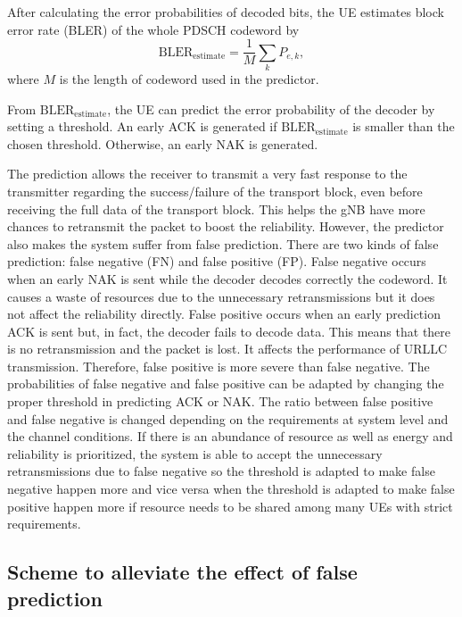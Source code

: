 \documentclass[conference]{IEEEtran}
\begin{document}
After calculating the error probabilities of decoded bits, the UE estimates block error rate (BLER) of the whole PDSCH codeword by
\begin{equation}
   \mathrm{BLER}_{\mathrm{estimate}} = \frac{1}{M} \sum_{k} P_{e,k},
\end{equation}
where $M$ is the length of codeword used in the predictor.


From $\mathrm{BLER}_{\mathrm{estimate}}$, the UE can predict the error probability of the decoder by setting a threshold. An early ACK is generated if $\mathrm{BLER}_{\mathrm{estimate}}$ is smaller than the chosen threshold. Otherwise, an early NAK is generated. 

The prediction allows the receiver to transmit a very fast response to the transmitter regarding the success/failure of the transport block, even before receiving the full data of the transport block. This helps the gNB have more chances to retransmit the packet to boost the reliability. However, the predictor also makes the system suffer from false prediction. There are two kinds of false prediction: false negative (FN) and false positive (FP). False negative occurs when an early NAK is sent while the decoder decodes correctly the codeword. It causes a waste of resources due to the unnecessary retransmissions but it does not affect the reliability directly. False positive occurs when an early prediction ACK is sent but, in fact, the decoder fails to decode data. This means that there is no retransmission and the packet is lost. It affects the performance of URLLC transmission. Therefore, false positive is more severe than false negative. The probabilities of false negative and false positive can be adapted by changing the proper threshold in predicting ACK or NAK. The ratio between false positive and false negative is changed depending on the requirements at system level and the channel conditions.  If there is an abundance of resource as well as energy and reliability is prioritized, the system is able to accept the unnecessary retransmissions due to false negative so the threshold is adapted to make false negative happen more and vice versa when the threshold is adapted to make false positive happen more if resource needs to be shared among many UEs with strict requirements.

\subsection{Scheme to alleviate the effect of false prediction}\label{CC}
\end{document}
